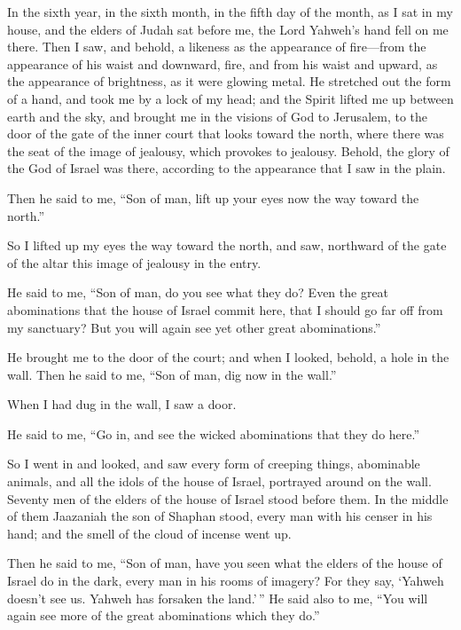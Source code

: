  In the sixth year, in the sixth month, in the fifth day of
the month, as I sat in my house, and the elders of Judah sat before me,
the Lord Yahweh's hand fell on me there.  Then I saw, and
behold, a likeness as the appearance of fire---from the appearance of
his waist and downward, fire, and from his waist and upward, as the
appearance of brightness, as it were glowing metal.  He
stretched out the form of a hand, and took me by a lock of my head; and
the Spirit lifted me up between earth and the sky, and brought me in the
visions of God to Jerusalem, to the door of the gate of the inner court
that looks toward the north, where there was the seat of the image of
jealousy, which provokes to jealousy.  Behold, the glory of
the God of Israel was there, according to the appearance that I saw in
the plain.

 Then he said to me, ``Son of man, lift up your eyes now the
way toward the north.''

So I lifted up my eyes the way toward the north, and saw, northward of
the gate of the altar this image of jealousy in the entry.

 He said to me, ``Son of man, do you see what they do? Even
the great abominations that the house of Israel commit here, that I
should go far off from my sanctuary? But you will again see yet other
great abominations.''

 He brought me to the door of the court; and when I looked,
behold, a hole in the wall.  Then he said to me, ``Son of
man, dig now in the wall.''

When I had dug in the wall, I saw a door.

 He said to me, ``Go in, and see the wicked abominations
that they do here.''

 So I went in and looked, and saw every form of creeping
things, abominable animals, and all the idols of the house of Israel,
portrayed around on the wall.  Seventy men of the elders of
the house of Israel stood before them. In the middle of them Jaazaniah
the son of Shaphan stood, every man with his censer in his hand; and the
smell of the cloud of incense went up.

 Then he said to me, ``Son of man, have you seen what the
elders of the house of Israel do in the dark, every man in his rooms of
imagery? For they say, `Yahweh doesn't see us. Yahweh has forsaken the
land.'\,''  He said also to me, ``You will again see more
of the great abominations which they do.''

